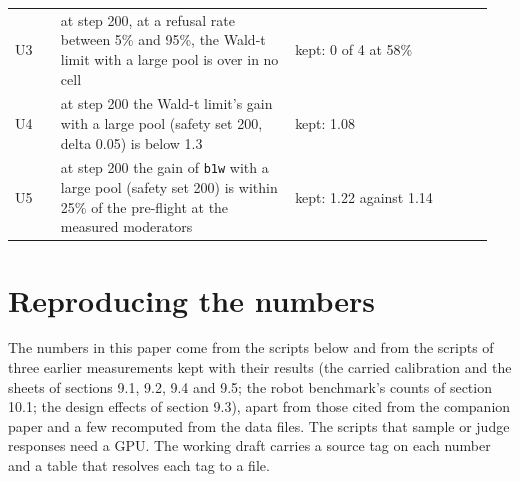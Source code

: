 \documentclass[11pt]{article}
\begin{document}
\begin{longtable}{@{}>{\raggedright\arraybackslash}p{0.093\linewidth}>{\raggedright\arraybackslash}p{0.461\linewidth}>{\raggedright\arraybackslash}p{0.392\linewidth}@{}}
\hspace{0pt}U3 & \hspace{0pt}at step 200, at a refusal rate between 5\% and 95\%, the Wald-t limit with a large pool is over in no cell & \hspace{0pt}kept: 0 of 4 at 58\% \\
\hspace{0pt}U4 & \hspace{0pt}at step 200 the Wald-t limit's gain with a large pool (safety set 200, delta 0.05) is below 1.3 & \hspace{0pt}kept: 1.08 \\
\hspace{0pt}U5 & \hspace{0pt}at step 200 the gain of \texttt{b1w} with a large pool (safety set 200) is within 25\% of the pre-flight at the measured moderators & \hspace{0pt}kept: 1.22 against 1.14 \\
\end{longtable}
\endgroup

\section{Reproducing the numbers}

The numbers in this paper come from the scripts below and from the scripts of three earlier measurements kept with their results (the carried calibration and the sheets of sections 9.1, 9.2, 9.4 and 9.5; the robot benchmark's counts of section 10.1; the design effects of section 9.3), apart from those cited from the companion paper and a few recomputed from the data files. The scripts that sample or judge responses need a GPU. The working draft carries a source tag on each number and a table that resolves each tag to a file.
\end{document}
